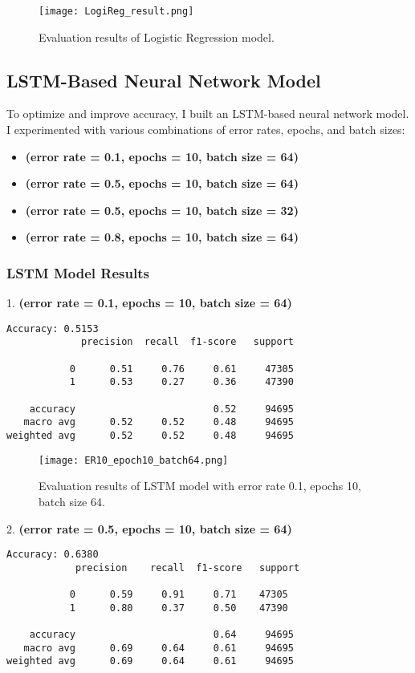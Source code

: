 \begin{figure}[h!]
    \centering
    \texttt{[image: LogiReg\_result.png]}
    \caption{Evaluation results of Logistic Regression model.}
    \label{fig:logreg_results}
\end{figure}

\subsection{LSTM-Based Neural Network Model}

To optimize and improve accuracy, I built an LSTM-based neural network model. I experimented with various combinations of error rates, epochs, and batch sizes:

\begin{itemize}
    \item \textbf{(error rate = 0.1, epochs = 10, batch size = 64)}
    \item \textbf{(error rate = 0.5, epochs = 10, batch size = 64)}
    \item \textbf{(error rate = 0.5, epochs = 10, batch size = 32)}
    \item \textbf{(error rate = 0.8, epochs = 10, batch size = 64)}
\end{itemize}

\subsubsection{LSTM Model Results}

1. \textbf{(error rate = 0.1, epochs = 10, batch size = 64)}
\begin{verbatim}
Accuracy: 0.5153
             precision  recall  f1-score   support

           0      0.51     0.76     0.61     47305
           1      0.53     0.27     0.36     47390

    accuracy                        0.52     94695
   macro avg      0.52     0.52     0.48     94695
weighted avg      0.52     0.52     0.48     94695
\end{verbatim}

\begin{figure}[h!]
    \centering
    \texttt{[image: ER10\_epoch10\_batch64.png]}
    \caption{Evaluation results of LSTM model with error rate 0.1, epochs 10, batch size 64.}
    \label{fig:lstm_results_0.1_10_64}
\end{figure}

2. \textbf{(error rate = 0.5, epochs = 10, batch size = 64)}
\begin{verbatim}
Accuracy: 0.6380
            precision    recall  f1-score   support

           0      0.59     0.91     0.71    47305
           1      0.80     0.37     0.50    47390

    accuracy                        0.64     94695
   macro avg      0.69     0.64     0.61     94695
weighted avg      0.69     0.64     0.61     94695
\end{verbatim}

